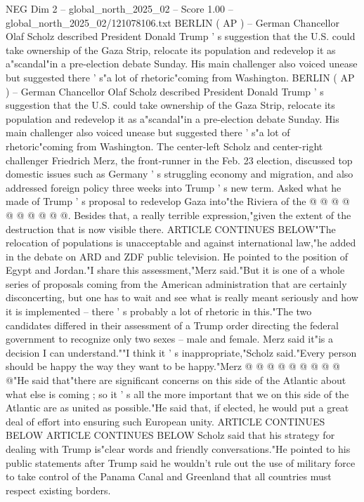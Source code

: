 \begin{textsample}{NEG Dim 2 – global\_north\_2025\_02 – Score 1.00 – global\_north\_2025\_02/121078106.txt}  \label{ex:f2_neg_005}
BERLIN ( AP ) -- German Chancellor Olaf Scholz described President Donald Trump ' s suggestion that the U.S. could take ownership of the Gaza Strip, relocate its population and redevelop it as a"scandal"in a pre-election debate Sunday.
His main challenger also voiced unease but suggested there ' s"a lot of rhetoric"coming from Washington.
BERLIN ( AP ) -- German Chancellor Olaf Scholz described President Donald Trump ' s suggestion that the U.S. could take ownership of the Gaza Strip, relocate its population and redevelop it as a"scandal"in a pre-election debate Sunday.
His main challenger also voiced unease but suggested there ' s"a lot of rhetoric"coming from Washington.
The center-left Scholz and center-right challenger Friedrich Merz, the front-runner in the Feb. 23 election, discussed top domestic issues such as Germany ' s struggling economy and migration, and also addressed foreign policy three weeks into Trump ' s new term.
Asked what he made of Trump ' s proposal to redevelop Gaza into"the Riviera of the @ @ @ @ @ @ @ @ @ @.
Besides that, a really terrible expression,"given the extent of the destruction that is now visible there.
ARTICLE CONTINUES BELOW"The relocation of populations is unacceptable and against international law,"he added in the debate on ARD and ZDF public television.
He pointed to the position of Egypt and Jordan."I share this assessment,"Merz said."But it is one of a whole series of proposals coming from the American administration that are certainly disconcerting, but one has to wait and see what is really meant seriously and how it is implemented -- there ' s probably a lot of rhetoric in this."The two candidates differed in their assessment of a Trump order directing the federal government to recognize only two sexes -- male and female.
Merz said it"is a decision I can understand.""I think it ' s inappropriate,"Scholz said."Every person should be happy the way they want to be happy."Merz @ @ @ @ @ @ @ @ @ @"He said that"there are significant concerns on this side of the Atlantic about what else is coming ; so it ' s all the more important that we on this side of the Atlantic are as united as possible."He said that, if elected, he would put a great deal of effort into ensuring such European unity.
ARTICLE CONTINUES BELOW ARTICLE CONTINUES BELOW Scholz said that his strategy for dealing with Trump is"clear words and friendly conversations."He pointed to his public statements after Trump said he wouldn't rule out the use of military force to take control of the Panama Canal and Greenland that all countries must respect existing borders.

\end{textsample}
